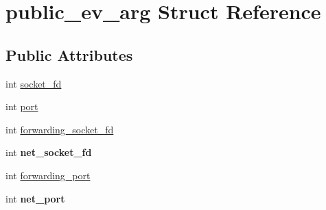 \hypertarget{structpublic__ev__arg}{\section{public\-\_\-ev\-\_\-arg \-Struct \-Reference}
\label{structpublic__ev__arg}
}
\subsection*{\-Public \-Attributes}
\begin{DoxyCompactItemize}
\item 
int \hyperlink{structpublic__ev__arg_a634c9a03c6dfe3c9991778e81e07f1a8}{socket\-\_\-fd}
\item 
int \hyperlink{structpublic__ev__arg_a1437cfc3f0d5b9d5ee3f6754b93a44df}{port}
\item 
int \hyperlink{structpublic__ev__arg_a152a3bdb23a5a71eaa0ca962ff966527}{forwarding\-\_\-socket\-\_\-fd}
\item 
\hypertarget{structpublic__ev__arg_ae999c283b9c7863cc65a4dc0b068a112}{int {\bfseries net\-\_\-socket\-\_\-fd}}\label{structpublic__ev__arg_ae999c283b9c7863cc65a4dc0b068a112}

\item 
int \hyperlink{structpublic__ev__arg_aaeeedc8ecdd9a155ea8b3036a85754fd}{forwarding\-\_\-port}
\item 
\hypertarget{structpublic__ev__arg_a2cf440f912eb2d36735da3daa7069a73}{int {\bfseries net\-\_\-port}}\label{structpublic__ev__arg_a2cf440f912eb2d36735da3daa7069a73}


\end{DoxyCompactItemize}
